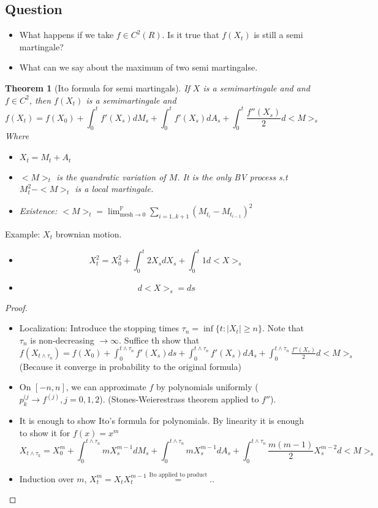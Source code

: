 \documentclass{article}
\newtheorem{theorem}{Theorem}
\begin{document}
\subsection{Question}
\begin{itemize}
\item What happens if we take $f \in C^2(R)$. Is it true that $f(X_t)$
  is still a semi martingale?
\item What can we say about the maximum of two semi martingalse.
\end{itemize}
\begin{theorem}[Ito formula for semi martingals]
  If $X$ is a semimartingale and and $f \in C^2$, then $f(X_t)$ is a semimartingale and
  $$f(X_t) = f(X_0) + \int_0^t f'(X_s) dM_s + \int_0^t f'(X_s)dA_s + \int_0^t \frac{f''(X_s)}2 d<M>_s$$
  Where
  \begin{itemize}
  \item $X_t = M_t + A_t$
  \item $<M>_t$ is the quandratic variation of $M$. It is the only BV process s.t $M_t^2 - <M>_t$ is a local martingale.
  \item Existence: $<M>_t = \lim^{\mathbb{P}}_{\text{mesh} \rightarrow 0} \sum_{i=1..k+1} (M_{t_i} - M_{t_{i-1}})^2$
  \end{itemize}
\end{theorem}
Example: $X_t$ brownian motion.
\begin{itemize}
\item $$X_t^2 = X_0^2 + \int_0^t 2X_s dX_s + \int_0^t 1 d<X>_s$$
\item $$d<X>_s = ds$$
\end{itemize}
\begin{proof}
  $ $\newline
\begin{itemize}
\item Localization:
  Introduce the stopping times $\tau_n = \inf \{ t: |X_t| \ge n\}$. Note that $\tau_n$ is non-decreasing $\rightarrow \infty$.
  Suffice th show that $f(X_{t \wedge \tau_n}) = f(X_0) + \int_0^{t \wedge \tau_n} f'(X_s)ds + \int_0^{t \wedge \tau_n} f'(X_s)dA_s + \int_0^{t \wedge \tau_n} \frac{f''(X_s)}2 d<M>_s$ (Because it converge in probability to the original formula)
\item On $[-n, n]$, we can approximate $f$ by polynomials uniformly ($p_k^{(j} \rightarrow f^{(j)}, j = 0, 1, 2$). (Stones-Weierestrass theorem applied to $f''$). 
\item It is enough to show Ito's formula for polynomials. By linearity it is enough to show it for $f(x) = x^m$
  $$X_{t \wedge \tau_k} = X_0^m + \int_0^{t \wedge \tau_n} mX_s^{m-1} dM_s + \int_0^{t \wedge \tau_n} m X_s^{m-1} dA_s + \int_0^{t \wedge \tau_n} \frac{m(m-1)}2 X_s^{m-2} d<M>_s$$
\item Induction over $m$, $X_t^m = X_t X_t^{m-1} \overset{\text{Ito applied to product}}{=} ..$
\end{itemize}
\end{proof}
\end{document}
